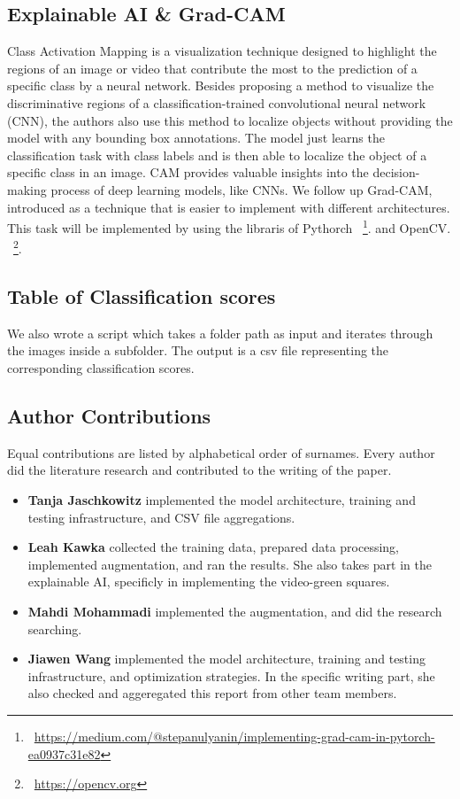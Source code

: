\subsection{Explainable AI \& Grad-CAM}
\label{sec:optim:cam}
Class Activation Mapping is a visualization technique designed to highlight the regions of an image or video that contribute the most to the prediction of a specific class by a neural network. 
Besides proposing a method to visualize the discriminative regions of a classification-trained convolutional neural network (CNN), the authors also use this method to localize objects without providing the model with any bounding box annotations. The model just learns the classification task with class labels and is then able to localize the object of a specific class in an image. 
CAM provides valuable insights into the decision-making process of deep learning models, like CNNs.
We follow up Grad-CAM, introduced as a technique that is easier to implement with different architectures.
This task will be implemented by using the libraris of Pythorch
~\footnote{~\url{https://medium.com/@stepanulyanin/implementing-grad-cam-in-pytorch-ea0937c31e82}}.
and OpenCV.
~\footnote{~\url{https://opencv.org}}.

\subsection{Table of Classification scores}
\label{sec:optim:csv}
We also wrote a script which takes a folder path as input and iterates through the images inside a subfolder. The output is a csv file representing the corresponding classification scores. 

\subsection*{Author Contributions}
\label{sec:author}
Equal contributions are listed by alphabetical order of surnames. 
Every author did the literature research and contributed to the writing of the paper. 

\begin{itemize}
  \item \textbf{Tanja Jaschkowitz} implemented the model architecture, training and testing infrastructure, and CSV file aggregations. 
  \item \textbf{Leah Kawka} collected the training data, prepared data processing, implemented augmentation, and ran the results. 
  She also takes part in the explainable AI, specificly in implementing the video-green squares.
  \item \textbf{Mahdi Mohammadi} implemented the augmentation, and did the research searching. 
  \item \textbf{Jiawen Wang} implemented the model architecture, training and testing infrastructure, and optimization strategies. 
  In the specific writing part, she also checked and aggeregated this report from other team members.
\end{itemize}

